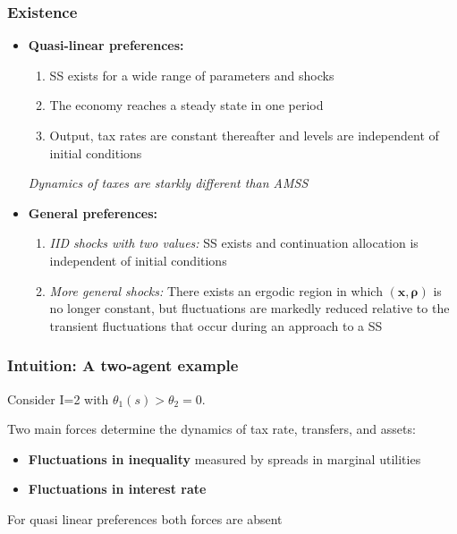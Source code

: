 \documentclass{beamer}
\begin{document}
\begin{frame}
\frametitle{Existence}
\begin{itemize}
 \item \textbf{Quasi-linear preferences:}
 \begin{enumerate}
                                           \item SS exists for a wide range of parameters and shocks
                                           \item The economy reaches a steady state in one period
                                           \item Output, tax rates are constant thereafter and levels are independent of initial conditions

\end{enumerate}
\emph{Dynamics of taxes are starkly different than AMSS}

 \item \textbf{General preferences:}
 \begin{enumerate}
 \item \emph{IID shocks with two values:} SS exists and continuation allocation is independent of initial conditions
 \item \emph{More general shocks:} There exists an ergodic region in which $\left( \bm{x},\bm{\rho} \right) $ is no longer constant, but  fluctuations are markedly reduced relative to the transient fluctuations that occur during an approach to  a SS
 \end{enumerate}
 \end{itemize}

\end{frame}


\begin{frame}
\frametitle{Intuition:  A two-agent example}

Consider I=2 with $\theta_1(s)>\theta_2=0$.

Two main forces determine the dynamics of tax rate, transfers,  and assets:
\begin{itemize}
 \item \textbf{Fluctuations in inequality}  measured by spreads in marginal utilities
\item  \textbf{Fluctuations in interest rate}
\end{itemize}
For quasi linear preferences both forces are absent

\end{frame}
\end{document}
